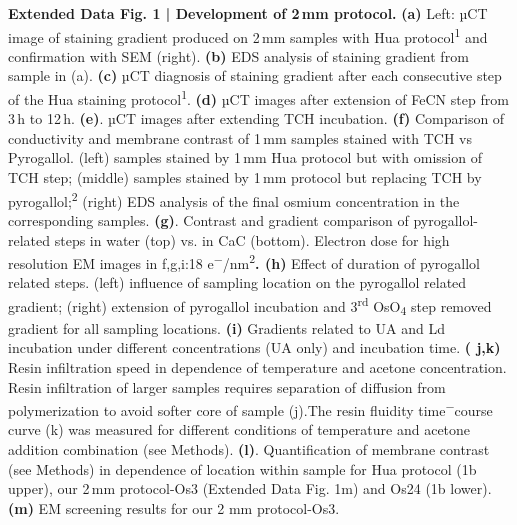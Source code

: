 \documentclass{article}
\begin{document}
\textbf{Extended Data Fig. 1 | Development of 2\,mm protocol.} \textbf{(a)} Left: µCT image of staining gradient produced on 2\,mm samples with Hua protocol\textsuperscript{1} and confirmation with SEM (right). \textbf{(b)} EDS analysis of staining gradient from sample in (a). \textbf{(c)} µCT diagnosis of staining gradient after each consecutive step of the Hua staining protocol\textsuperscript{1}. \textbf{(d)} µCT images after extension of FeCN step from 3\,h to 12\,h. \textbf{(e)}. µCT images after extending TCH incubation. \textbf{(f)} Comparison of conductivity and membrane contrast of 1\,mm samples stained with TCH vs Pyrogallol. (left) samples stained by 1\,mm Hua protocol but with omission of TCH step; (middle) samples stained by 1\,mm protocol but replacing TCH by pyrogallol;\textsuperscript{2} (right) EDS analysis of the final osmium concentration in the corresponding samples. \textbf{(g)}. Contrast and gradient comparison of pyrogallol-related steps in water (top) vs. in CaC (bottom). Electron dose for high resolution EM images in f,g,i:18 e\textsuperscript{−}/nm\textsuperscript{2}\textbf{. (h)} Effect of duration of pyrogallol related steps. (left) influence of sampling location on the pyrogallol related gradient; (right) extension of pyrogallol incubation and 3\textsuperscript{rd} OsO\textsubscript{4} step removed gradient for all sampling locations. \textbf{(i)} Gradients related to UA and Ld incubation under different concentrations (UA only) and incubation time. \textbf{( j,k)} Resin infiltration speed in dependence of temperature and acetone concentration. Resin infiltration of larger samples requires separation of diffusion from polymerization to avoid softer core of sample (j).The resin fluidity time\textsuperscript{−}course curve (k) was measured for different conditions of temperature and acetone addition combination (see Methods). \textbf{(l)}. Quantification of membrane contrast (see Methods) in dependence of location within sample for Hua protocol (1b upper), our 2\,mm protocol-Os3 (Extended Data Fig. 1m) and Os24 (1b lower). \textbf{(m)} EM screening results for our 2 mm protocol-Os3.
\end{document}

